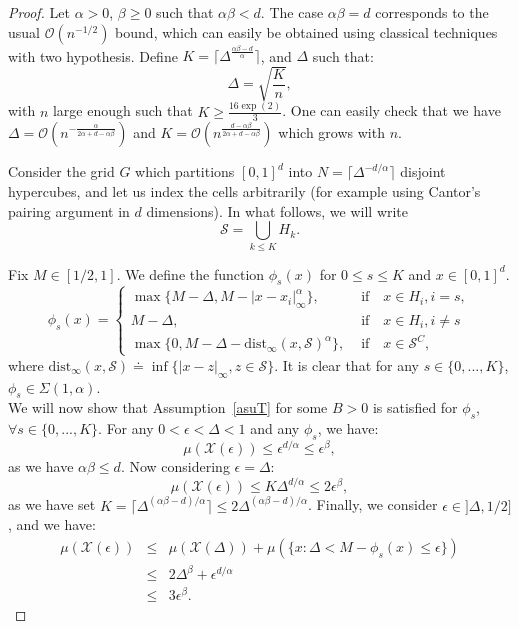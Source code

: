 \documentclass[final,12pt]{colt2018}
\newcommand{\bigO}[1]{\mathcal O\left( #1 \right)}
\begin{document}
\begin{proof}
Let $\alpha > 0$, $\beta \geq 0$ such that $\alpha\beta < d$. The case $\alpha\beta = d$ corresponds to the usual $\bigO{n^{-1/2}}$ bound, which can easily be obtained using classical techniques with two hypothesis. Define $K = \lceil{\Delta^{\frac{\alpha\beta - d}{\alpha}}\rceil}$, and $\Delta$ such that:
$$
\Delta = \sqrt{\frac{K}{n}},
$$
with $n$ large enough such that $K \geq \frac{16\exp(2)}{3}$. One can easily check that we have $\Delta = \bigO{n^{-\frac{\alpha}{2\alpha + d - \alpha\beta}}}$ and $K = \bigO{n^{\frac{d-\alpha\beta}{2\alpha + d - \alpha\beta}}}$ which grows with $n$.

Consider the grid $G$ which partitions $[0,1]^d$ into $N = \lceil \Delta^{-d/\alpha} \rceil$ disjoint hypercubes, and let us index the cells arbitrarily (for example using Cantor's pairing argument in $d$ dimensions). In what follows, we will write
$$\mathcal S = \bigcup_{k\leq K} H_k.$$


\noindent

Fix $M \in [1/2,1]$. We define the function $\phi_{s}(x)$ for $0 \leq s \leq K$ and $x \in [0,1]^d$.
\begin{equation*}
\phi_{s}(x) = \begin{cases}
\max\{M-\Delta,M-|x-x_i|_{\infty}^{\alpha}\}, &\text{~if~~~} x\in H_i, i=s,\\
M -\Delta, &\text{~if~~~} x\in H_i, i \neq s\\
\max\{0, M -\Delta - \text{dist}_{\infty}(x, \mathcal{S})^{\alpha}\}, &\text{~if~~~} x \in \mathcal{S}^C,
\end{cases}
\end{equation*}
where $\text{dist}_\infty(x, \mathcal{S}) \doteq \inf\{|x-z|_\infty, z \in \mathcal S\}$. It is clear that for any $s \in \{0, ..., K\}$, $\phi_s \in \Sigma(1,\alpha)$. \\
We will now show that Assumption~\ref{asuT} for some $B >0$ is satisfied for $\phi_s$, $\forall s \in \{0,..., K\}$. For any $0 <\epsilon < \Delta < 1$ and any $\phi_s$, we have:
$$
\mu(\mathcal X(\epsilon)) \leq \epsilon^{d/\alpha} \leq \epsilon^\beta,
$$
as we have $\alpha\beta \leq d$. Now considering $\epsilon = \Delta$:
$$
\mu(\mathcal X(\epsilon)) \leq K \Delta^{d/\alpha} \leq 2 \epsilon^{\beta},
$$
as we have set $K = \lceil{\Delta^{(\alpha\beta-d)/\alpha}\rceil} \leq 2 \Delta^{(\alpha\beta-d)/\alpha}$. Finally, we consider $\epsilon \in ]\Delta, 1/2] $, and we have:
\begin{eqnarray*}
\mu(\mathcal X(\epsilon)) & \leq & \mu(\mathcal X(\Delta)) + \mu(\{x: \Delta < M- \phi_s(x) \leq \epsilon \})\\
& \leq & 2 \Delta^\beta + \epsilon^{d/\alpha}\\
& \leq & 3 \epsilon^\beta.
\end{eqnarray*}



\end{proof}
\end{document}
